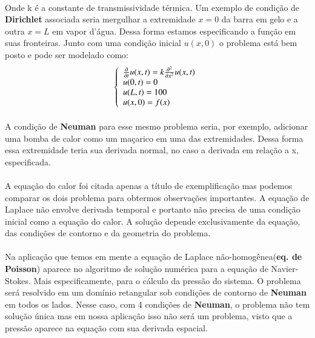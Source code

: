 \documentclass[a4paper,11pt]{article}
\begin{document}
\paragraph{}Onde k é a constante de transmissividade térmica. Um exemplo de condição de \textbf{Dirichlet} associada seria mergulhar a extremidade $x = 0$ da barra em gelo e a outra $x = L$ em vapor d'água. Dessa forma estamos especificando a função em suas fronteiras. Junto com uma condição inicial $u(x, 0)$ o problema está bem posto e pode ser modelado como:
\begin{equation}
\left\{ 
	\begin{array}{l}
	\del{t}{1} u(x,t) = k \del{x}{2} u(x,t) \\
	u(0, t) = 0 \\
	 u(L, t) = 100 \\
	u(x, 0) = f(x)
	\end{array}
\right.
\end{equation}
\paragraph{} A condição de \textbf{Neuman} para esse mesmo problema seria, por exemplo, adicionar uma bomba de calor como um maçarico em uma das extremidades. Dessa forma essa extremidade teria sua derivada normal, no caso a derivada em relação a x, especificada. 

\paragraph{}A equação do calor foi citada apenas a título de exemplificação mas podemos comparar os dois problema para obtermos observações importantes. A equação de Laplace não envolve derivada temporal e portanto não precisa de uma condição inicial como a equação do calor. A solução depende exclusivamente da equação, das condições de contorno e da geometria do problema.

\paragraph{}Na aplicação que temos em mente a equação de Laplace não-homogênea(\textbf{eq. de Poisson}) aparece no algoritmo de solução numérica para a equação de Navier-Stokes. Mais especificamente, para o cálculo da pressão do sistema. O problema será resolvido em um domínio retangular sob condições de contorno de \textbf{Neuman} em todos os lados. Nesse caso, com 4 condições de \textbf{Neuman}, o problema não tem solução única mas em nossa aplicação isso não será um problema, visto que a pressão aparece na equação com sua derivada espacial.
\end{document}
